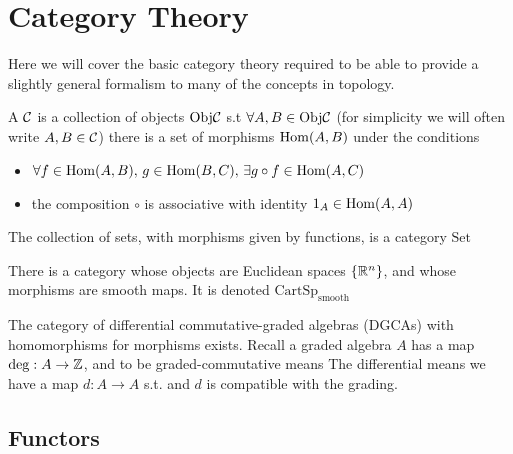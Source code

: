 \documentclass{article}
\begin{document}
\section{Category Theory}
Here we will cover the basic category theory required to be able to provide a slightly general formalism to many of the concepts in topology. 

\begin{definition}
	A  $\mathcal{C}$ is a collection of objects $\text{Obj}\mathcal{C}$ s.t $\forall A,B \in  \text{Obj}\mathcal{C}$ (for simplicity we will often write $A,B \in \mathcal{C}$) there is a set of morphisms $\operatorname{Hom}(A,B)$ under the conditions
	\begin{itemize}
		\item $\forall f \in \operatorname{Hom}(A,B), \, g \in \operatorname{Hom}(B,C), \, \exists g \circ f \in \operatorname{Hom}(A,C)$
		\item the composition $\circ$ is associative with identity $1_A \in \operatorname{Hom}(A,A)$
	\end{itemize}
\end{definition}

\begin{example}
	The collection of sets, with morphisms given by functions, is a category $\text{Set}$
\end{example}

\begin{example}
	There is a category whose objects are Euclidean spaces $\left\{ \mathbb{R}^n \right\}$, and whose morphisms are smooth maps. It is denoted $\text{CartSp}_{\text{smooth}}$
\end{example}

\begin{example}
	The category of differential commutative-graded algebras (DGCAs) with homomorphisms for morphisms exists. Recall a graded algebra $A$ has a map $\deg : A \to \mathbb{Z}$, and to be graded-commutative means 
	The differential means we have a map $d:A \to A$ s.t. 
	and $d$ is compatible with the grading.
\end{example}

\subsection{Functors}
\end{document}
